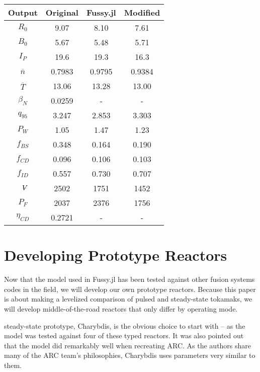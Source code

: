 \begin{table}[h!]
\begin{subtable}[t]{0.5\textwidth}
\begin{tabular}{ c|c|c|c }
Output           & Original         & Fussy.jl  & Modified      \\
\hline
$R_{0}$          & 9.07            & 8.10   & 7.61           \\
$B_{0}$          & 5.67            & 5.48   &  5.71        \\
$I_{P}$          & 19.6             & 19.3 &   16.3       \\
$\overline n$    & 0.7983           & 0.9795 &   0.9384      \\
$\overline T$    & 13.06            & 13.28 & 13.00         \\
$\beta_{N}$       & 0.0259           & - & -         \\
$q_{95}$         & 3.247            & 2.853 & 3.303          \\
$P_{W}$          & 1.05             & 1.47 & 1.23          \\
$f_{BS}$         & 0.348            & 0.164 & 0.190         \\
$f_{CD}$         & 0.096            & 0.106 &  0.103        \\
$f_{ID}$         & 0.557            & 0.730  & 0.707         \\
$\volume$         & 2502           & 1751  & 1452        \\
$P_{F}$          & 2037           & 2376 & 1756         \\
$\eta_{CD}$      & 0.2721           & - & -    

\end{tabular}
\end{subtable}
\hfill
\hfill
\label{table:demo_pulsed}
\end{table}

\clearpage

\newpage

\section{Developing Prototype Reactors}

Now that the model used in Fussy.jl has been tested against other fusion systems codes in the field, we will develop our own prototype reactors. Because this paper is about making a levelized comparison of pulsed and steady-state tokamaks, we will develop middle-of-the-road reactors that only differ by operating mode. 

 steady-state prototype, Charybdis, is the obvious choice to start with -- as the model was tested against four of these typed reactors. It was also pointed out that the model did remarkably well when recreating ARC. As the authors share many of the ARC team's philosophies, Charybdis uses  parameters very similar to them.\cite{arc}

